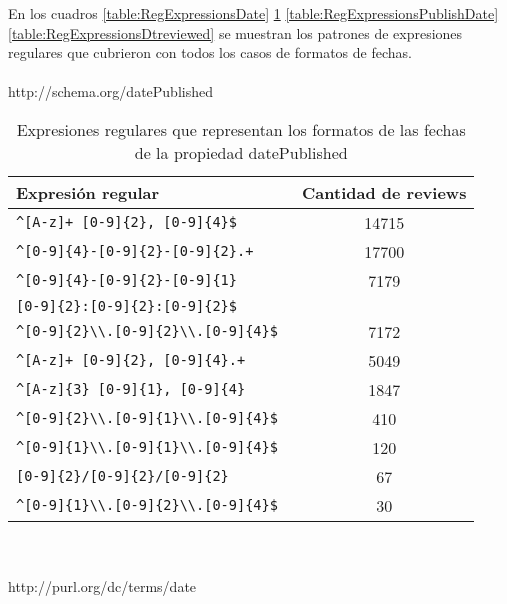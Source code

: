 En los cuadros \ref{table:RegExpressionsDate} \ref{table:RegExpressionsDatePublished} \ref{table:RegExpressionsPublishDate} \ref{table:RegExpressionsDtreviewed} se muestran los patrones de expresiones regulares que cubrieron con todos los casos de formatos 
de fechas.
\\
\\
http://schema.org/datePublished\\
\begin{table}[h]
\begin{tabular}{| l | c |} \hline
Expresión regular & Cantidad de reviews\\\hline
\verb|^[A-z]+ [0-9]{2}, [0-9]{4}$ |& 14715 \\\hline
\verb|^[0-9]{4}-[0-9]{2}-[0-9]{2}.+ |& 17700 \\\hline
\verb|^[0-9]{4}-[0-9]{2}-[0-9]{1} |& 7179 \\ \verb|[0-9]{2}:[0-9]{2}:[0-9]{2}$| & \\\hline
\verb|^[0-9]{2}\\.[0-9]{2}\\.[0-9]{4}$ |& 7172\\\hline
\verb|^[A-z]+ [0-9]{2}, [0-9]{4}.+ |& 5049\\\hline
\verb|^[A-z]{3} [0-9]{1}, [0-9]{4} |& 1847\\\hline
\verb|^[0-9]{2}\\.[0-9]{1}\\.[0-9]{4}$ |& 410\\\hline
\verb|^[0-9]{1}\\.[0-9]{1}\\.[0-9]{4}$ |& 120\\\hline
\verb|[0-9]{2}/[0-9]{2}/[0-9]{2} |& 67\\\hline
\verb|^[0-9]{1}\\.[0-9]{2}\\.[0-9]{4}$ |& 30 \\\hline
\end{tabular}
\caption{Expresiones regulares que representan los formatos de las fechas de la propiedad datePublished}
\label{table:RegExpressionsDatePublished}
\end{table}
\\
\\
http://purl.org/dc/terms/date\\
